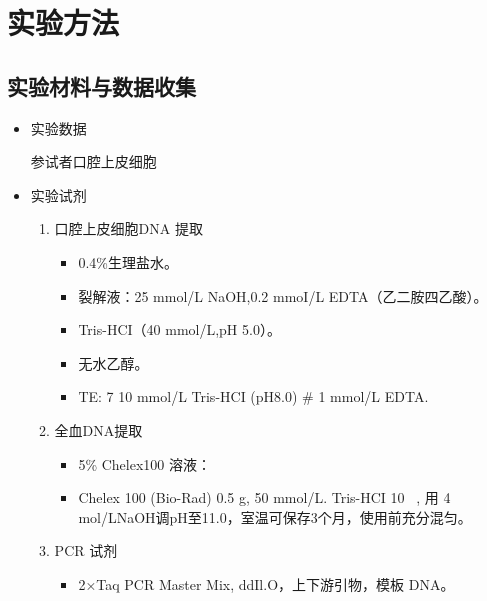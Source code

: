 \documentclass[AutoFakeBold]{LZUThesis}
\begin{document}
\section{实验方法}

\subsection{实验材料与数据收集}
\begin{itemize}
    \item 实验数据\par
    参试者口腔上皮细胞
    \item 实验试剂\par
    \begin{enumerate}
        \item 口腔上皮细胞DNA 提取\par
        \begin{itemize}
            \item 0.4\%生理盐水。\par
            \item 裂解液：25 mmol/L NaOH,0.2 mmoI/L EDTA（乙二胺四乙酸）。\par
            \item Tris-HCI（40 mmol/L,pH 5.0）。\par
            \item 无水乙醇。\par
            \item TE: 7 10 mmol/L Tris-HCI (pH8.0) # 1 mmol/L EDTA.\par
        \end{itemize}
        \item 全血DNA提取\par
        \begin{itemize}
            \item 5\% Chelex100 溶液：\par
            \item Chelex 100 (Bio-Rad) 0.5 g, 50 mmol/L. Tris-HCI 10 \, \mu{}, 用
            4 mol/LNaOH调pH至11.0，室温可保存3个月，使用前充分混匀。\par
        \end{itemize}
        \item PCR 试剂\par
        \begin{itemize}
            \item 2×Taq PCR Master Mix, ddIl.O，上下游引物，模板 DNA。\par

\end{itemize}
\end{enumerate}
\end{itemize}
\end{document}
